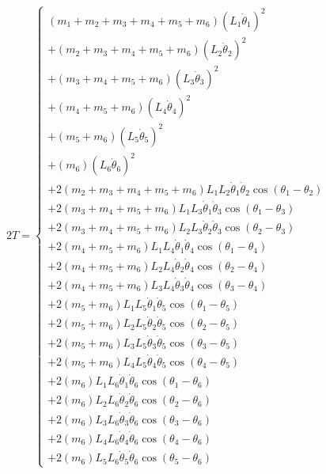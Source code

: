 \begin{align}
2T=\left\{\begin{array}{l}
\left(m_1+m_2+m_3+m_4+m_5+m_6\right)\left(L_1\dot{\theta}_1\right)^2\\
+\left(m_2+m_3+m_4+m_5+m_6\right)\left(L_2\dot{\theta}_2\right)^2\\
+\left(m_3+m_4+m_5+m_6\right)\left(L_3\dot{\theta}_3\right)^2\\
+\left(m_4+m_5+m_6\right)\left(L_4\dot{\theta}_4\right)^2\\
+\left(m_5+m_6\right)\left(L_5\dot{\theta}_5\right)^2\\
+\left(m_6\right)\left(L_6\dot{\theta}_6\right)^2\\
+2\left(m_2+m_3+m_4+m_5+m_6\right)L_1L_{2}\dot{\theta}_1\dot{\theta}_{2}\cos\left(\theta_1 -\theta_{2}\right)\\
+2\left(m_3+m_4+m_5+m_6\right)L_1L_{3}\dot{\theta}_1\dot{\theta}_{3}\cos\left(\theta_1 -\theta_{3}\right)\\
+2\left(m_3+m_4+m_5+m_6\right)L_2L_{3}\dot{\theta}_2\dot{\theta}_{3}\cos\left(\theta_2 -\theta_{3}\right)\\
+2\left(m_4+m_5+m_6\right)L_1L_{4}\dot{\theta}_1\dot{\theta}_{4}\cos\left(\theta_1 -\theta_{4}\right)\\
+2\left(m_4+m_5+m_6\right)L_2L_{4}\dot{\theta}_2\dot{\theta}_{4}\cos\left(\theta_2 -\theta_{4}\right)\\
+2\left(m_4+m_5+m_6\right)L_3L_{4}\dot{\theta}_3\dot{\theta}_{4}\cos\left(\theta_3 -\theta_{4}\right)\\
+2\left(m_5+m_6\right)L_1L_{5}\dot{\theta}_1\dot{\theta}_{5}\cos\left(\theta_1 -\theta_{5}\right)\\
+2\left(m_5+m_6\right)L_2L_{5}\dot{\theta}_2\dot{\theta}_{5}\cos\left(\theta_2 -\theta_{5}\right)\\
+2\left(m_5+m_6\right)L_3L_{5}\dot{\theta}_3\dot{\theta}_{5}\cos\left(\theta_3 -\theta_{5}\right)\\
+2\left(m_5+m_6\right)L_4L_{5}\dot{\theta}_4\dot{\theta}_{5}\cos\left(\theta_4 -\theta_{5}\right)\\
+2\left(m_6\right)L_1L_{6}\dot{\theta}_1\dot{\theta}_{6}\cos\left(\theta_1 -\theta_{6}\right)\\
+2\left(m_6\right)L_2L_{6}\dot{\theta}_2\dot{\theta}_{6}\cos\left(\theta_2 -\theta_{6}\right)\\
+2\left(m_6\right)L_3L_{6}\dot{\theta}_3\dot{\theta}_{6}\cos\left(\theta_3 -\theta_{6}\right)\\
+2\left(m_6\right)L_4L_{6}\dot{\theta}_4\dot{\theta}_{6}\cos\left(\theta_4 -\theta_{6}\right)\\
+2\left(m_6\right)L_5L_{6}\dot{\theta}_5\dot{\theta}_{6}\cos\left(\theta_5 -\theta_{6}\right)
\end{array}\right.
\end{align}
